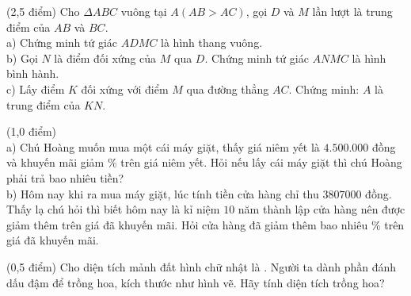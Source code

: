\begin{ex}
(2,5 điểm) Cho $\Delta ABC$ vuông tại $A\left(AB>AC\right)$, gọi $D$ và $M$ lần lượt là trung điểm của $AB$ và $BC$.\\
a) Chứng minh tứ giác $ADMC$ là hình thang vuông.\\
b) Gọi $N$ là điểm đối xứng của $M$ qua $D$. Chứng minh tứ giác $ANMC$ là hình bình hành.\\
c) Lấy điểm $K$ đối xứng với điểm $M$ qua đường thẳng $AC$. Chứng minh: $A$ là trung điểm của $KN$.
\end{ex}
\begin{ex}
(1,0 điểm) \\
a) Chú Hoàng muốn mua một cái máy giặt, thấy giá niêm yết là $4.500.000$ đồng và khuyến mãi giảm  $\%$ trên giá niêm yết. Hỏi nếu lấy cái máy giặt thì chú Hoàng phải trả bao nhiêu tiền? \\
b) Hôm nay khi ra mua máy giặt, lúc tính tiền cửa hàng chỉ thu $3 807 000$ đồng. Thấy lạ chú hỏi thì biết hôm nay là kỉ niệm $10$ năm thành lập cửa hàng nên được giảm thêm trên giá đã khuyến mãi. Hỏi cửa hàng đã giảm thêm bao nhiêu $\%$ trên giá đã khuyến mãi.
\end{ex}
\begin{ex}
(0,5 điểm) Cho diện tích mảnh đất hình chữ nhật là  . Người ta dành phần đánh dấu đậm để trồng hoa, kích thước như hình vẽ. Hãy tính diện tích trồng hoa?
\end{ex}

